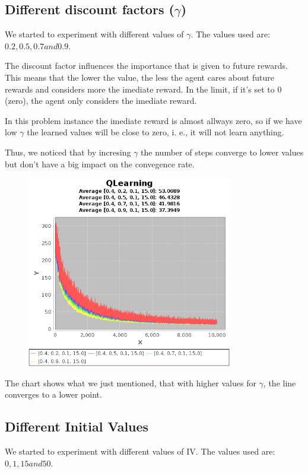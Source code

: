 \documentclass{article}
\begin{document}
\subsection{Different discount factors ($\gamma$)}
We started to experiment with different values of $\gamma$. The values used are:
$0.2, 0.5, 0.7 and 0.9$. 

The discount factor influences the importance that is given to future rewards.
This means that the lower the value, the less the agent cares about future
rewards and considers more the imediate reward. In the limit, if it's set to
$0$ (zero), the agent only considers the imediate reward.

In this problem instance the imediate reward is almost allways zero, so if we
have low $\gamma$ the learned values will be close to zero, i. e., it will not
learn anything. 

Thus, we noticed that by incresing $\gamma$ the number of steps converge to
lower values but don't have a big impact on the convegence rate.

\begin{figure}[h]
\centering
\includegraphics[width=0.8\textwidth]{res/alpha_04_gama_02_to_09_epsilon_01_IV_15.png}
\end{figure}

The chart shows what we just mentioned, that with higher values for $\gamma$,
the line converges to a lower point.

\subsection{Different Initial Values}
We started to experiment with different values of IV. The values used are:
$0, 1, 15 and 50$. 
\end{document}
